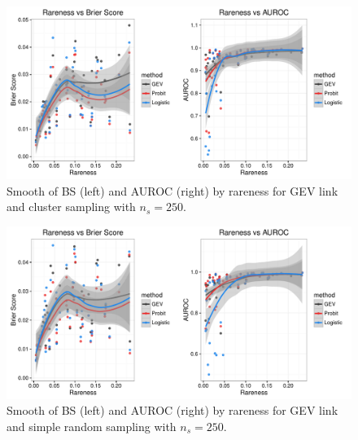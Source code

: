 %
%

\begin{figure}  %
	\centering
	\includegraphics[width=\linewidth]{plots/byrareness-3}
	\caption{Smooth of BS (left) and AUROC (right) by rareness for GEV link and cluster sampling with $n_s = 250$.}
	\label{rbfig:simsmooth-gevclu250}
\end{figure}

\begin{figure} %
	\includegraphics[width=\linewidth]{plots/byrareness-4}
	\caption{Smooth of BS (left) and AUROC (right) by rareness for GEV link and simple random sampling with $n_s = 250$.}
	\label{rbfig:simsmooth-gevsrs250}
\end{figure}

